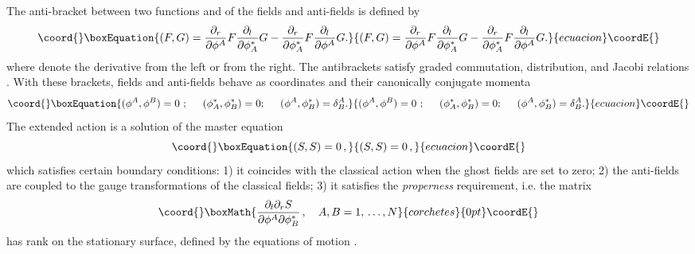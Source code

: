 \documentclass[a4paper,12pt]{article}
\begin{document}
The {anti-bracket} between two functions \coordHE{} and \coordHE{} of
the fields and anti-fields is defined by
\begin{equation}\coord{}\boxEquation{\label{abracket}
\left( F, G \right) = 
\frac{\partial_r }{\partial\phi ^A}  F \frac{\partial_l }{\partial\phi
  ^*_A} G -  
\frac{\partial_r }{\partial\phi ^*_A} F  \frac{\partial_l
  }{\partial\phi ^A} G.   
}{\left( F, G \right) = 
\frac{\partial_r }{\partial\phi ^A}  F \frac{\partial_l }{\partial\phi
  ^*_A} G -  
\frac{\partial_r }{\partial\phi ^*_A} F  \frac{\partial_l
  }{\partial\phi ^A} G.   
}{ecuacion}\coordE{}\end{equation}
where \coordHE{} denote the derivative from the left or from the
right.   
The antibrackets satisfy graded commutation, distribution, and Jacobi
relations \cite{BV}.  
With these brackets, fields and anti-fields behave as coordinates and
their canonically conjugate momenta   
\begin{equation}\coord{}\boxEquation{\label{eq:brackffs}
(\phi^A,\phi^B)=0\ ;\hspace{0.5cm}
(\phi^*_A,\phi^*_B)=0;\hspace{0.5cm}
(\phi^A,\phi^*_B)=\delta^A_B.
}{(\phi^A,\phi^B)=0\ ;\hspace{0.5cm}
(\phi^*_A,\phi^*_B)=0;\hspace{0.5cm}
(\phi^A,\phi^*_B)=\delta^A_B.
}{ecuacion}\coordE{}\end{equation}
%
The extended action \coordHE{} is a solution of the master equation  
\begin{equation}\coord{}\boxEquation{\label{master}
(S,S)=0\, ,
}{(S,S)=0\, ,
}{ecuacion}\coordE{}\end{equation}
which satisfies certain boundary conditions:
1) it coincides with the classical action \coordHE{}
when the ghost fields are set to zero; 2) the
anti-fields \coordHE{}  
are coupled to the gauge transformations of the classical fields; 3)
it satisfies the \emph{properness} requirement, i.e. the \coordHE{} matrix
\begin{displaymath}\coord{}\boxMath{
  \frac{\partial_l \partial_r S}{\partial \phi^A \partial \phi_B^*}\, ,
  ~~~A,B = 1, \, \ldots, N
}{corchetes}{0pt}\coordE{}\end{displaymath}
has rank \coordHE{} on the stationary surface, defined by the equations of motion 
\coordHE{}.
\end{document}

